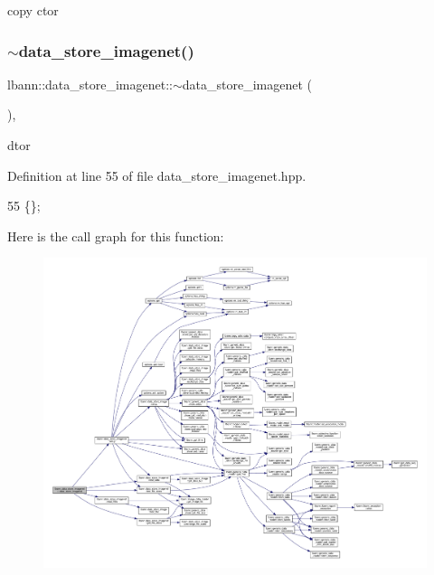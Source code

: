 copy ctor 

\mbox{\label{classlbann_1_1data__store__imagenet_aa6f4479472b06cd7a8da399dd23b7487}} 
\subsubsection{\texorpdfstring{$\sim$data\+\_\+store\+\_\+imagenet()}{~data\_store\_imagenet()}}
{\footnotesize\ttfamily lbann\+::data\+\_\+store\+\_\+imagenet\+::$\sim$data\+\_\+store\+\_\+imagenet (\begin{DoxyParamCaption}{ }\end{DoxyParamCaption})\hspace{0.3cm}{\ttfamily [inline]}, {\ttfamily [override]}}



dtor 



Definition at line 55 of file data\+\_\+store\+\_\+imagenet.\+hpp.


\begin{DoxyCode}
55 \{\};
\end{DoxyCode}
Here is the call graph for this function\+:\nopagebreak
\begin{figure}[H]
\begin{center}
\leavevmode
\includegraphics[width=350pt]{classlbann_1_1data__store__imagenet_aa6f4479472b06cd7a8da399dd23b7487_cgraph}
\end{center}
\end{figure}


